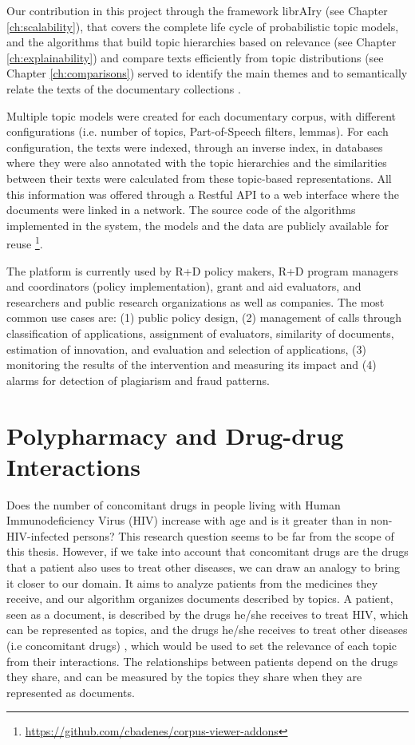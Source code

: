 Our contribution in this project through the framework librAIry (see Chapter \ref{ch:scalability}), that covers the complete life cycle of probabilistic topic models, and the algorithms that build topic hierarchies based on relevance (see Chapter \ref{ch:explainability}) and compare texts efficiently from topic distributions (see Chapter \ref{ch:comparisons}) served to identify the main themes and to semantically relate the texts of the documentary collections \citep{Samy2019}. 

Multiple topic models were created for each documentary corpus, with different configurations (i.e. number of topics, Part-of-Speech filters, lemmas). For each configuration, the texts were indexed, through an inverse index, in databases where they were also annotated with the topic hierarchies and the similarities between their texts were calculated from these topic-based representations. All this information was offered through a Restful API to a web interface where the documents were linked in a network. The source code of the algorithms implemented in the system, the models and the data are publicly available for reuse \footnote{\url{https://github.com/cbadenes/corpus-viewer-addons}}.

The platform is currently used by R+D policy makers, R+D program managers and coordinators (policy implementation), grant and aid evaluators, and researchers and public research organizations as well as companies. The most common use cases are: (1) public policy design, (2) management of calls through classification of applications, assignment of evaluators, similarity of documents, estimation of innovation, and evaluation and selection of applications, (3) monitoring the results of the intervention and measuring its impact and (4) alarms for detection of plagiarism and fraud patterns. 

\section{Polypharmacy and Drug-drug Interactions}
\label{sec:polypharmacy}

Does the number of concomitant drugs in people living with Human Immunodeficiency Virus (HIV) increase with age and is it greater than in non-HIV-infected persons? This research question \citep{Badenes-Olmedo2019c} seems to be far from the scope of this thesis. However, if we take into account that  concomitant drugs are the drugs that a patient also uses to treat other diseases, we can draw an analogy to bring it closer to our domain. It aims to analyze patients from the medicines they receive, and our algorithm organizes documents described by topics. A patient, seen as a document, is described by the drugs he/she receives to treat HIV, which can be represented as topics, and the drugs he/she receives to treat other diseases (i.e concomitant drugs) , which would be used to set the relevance of each topic from their interactions. The relationships between patients depend on the drugs they share, and can be measured by the topics they share when they are represented as documents.


